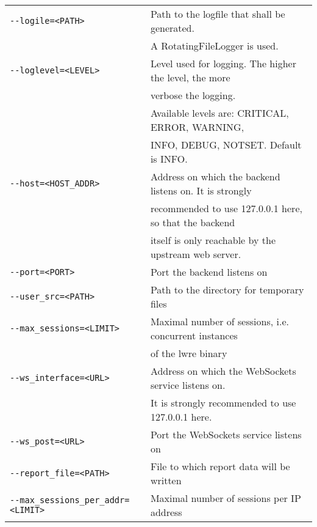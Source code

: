 \begin{tabular}{@{}l l}
\verb|--logile=<PATH>|                          & Path to the logfile that shall be generated.\\
                                                             & A RotatingFileLogger is used.\\
\verb|--loglevel=<LEVEL>|                       & Level used for logging. The higher the level, the more\\
                                                             & verbose the logging.\\
                                                             & Available levels are: CRITICAL, ERROR, WARNING,\\
                                                             & INFO, DEBUG, NOTSET. Default is INFO.\\
\verb|--host=<HOST_ADDR>|        & Address on which the backend listens on. It is strongly\\
                                                             & recommended to use 127.0.0.1 here, so that the backend\\
                                                             &  itself is only reachable by the upstream web server.\\
\verb|--port=<PORT>|                           & Port the backend listens on\\
\verb|--user_src=<PATH>|         & Path to the directory for temporary files\\
\verb|--max_sessions=<LIMIT>|  & Maximal number of sessions, i.e. concurrent instances\\
                                                             & of the lwre binary\\
\verb|--ws_interface=<URL>|      & Address on which the WebSockets service listens on.\\
                                                             & It is strongly recommended to use 127.0.0.1 here.\\
\verb|--ws_post=<URL>|           & Port the WebSockets service listens on\\
\verb|--report_file=<PATH>|           & File to which report data will be written\\
\verb|--max_sessions_per_addr=<LIMIT>|           & Maximal number of sessions per IP address\\
\end{tabular}

